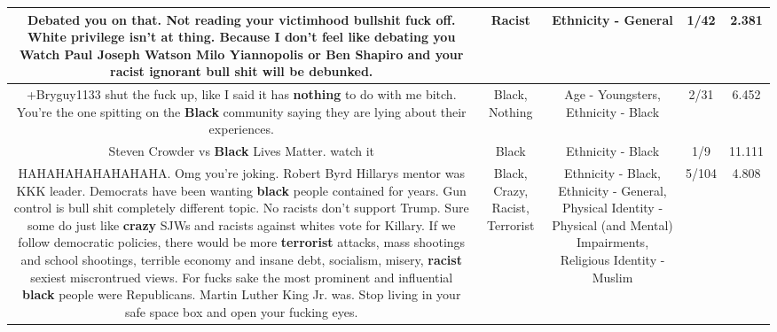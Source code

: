 \documentclass[11pt]{article}
\newlength\mylength
\begin{document}
\begin{center}
\begin{longtable}{|C{.65\mylength}|C{.30\mylength}|C{.12\mylength}|C{.12\mylength}|C{.12\mylength}|}
  \small {} Debated you on that. Not reading  your victimhood bullshit fuck off. White privilege isn't at thing. Because I don't feel like debating you Watch Paul Joseph Watson Milo Yiannopolis or Ben Shapiro and your \textbf{racist} ignorant bull shit will be debunked.\normalsize   & Racist & Ethnicity - General & 1/42 & 2.381 \\  \hline
  \small +Bryguy1133 shut the fuck up, like I said it has \textbf{nothing} to do with me bitch. You're the one spitting on the \textbf{Black} community saying they are lying about their experiences.\normalsize   & Black, Nothing & Age - Youngsters, Ethnicity - Black & 2/31 & 6.452 \\  \hline
  \small {} Steven Crowder vs \textbf{Black} Lives Matter. watch it\normalsize   & Black & Ethnicity - Black & 1/9 & 11.111 \\  \hline
  \small {} HAHAHAHAHAHAHAHA. Omg you're joking. Robert Byrd Hillarys mentor was  KKK leader. Democrats have been wanting \textbf{black} people contained for years. Gun control is bull shit completely different topic. No racists don't support Trump. Sure some do just like \textbf{crazy} SJWs and racists against whites vote for Killary. If we follow democratic policies, there would be more \textbf{terrorist} attacks, mass shootings and school shootings, terrible economy and insane debt, socialism, misery, \textbf{racist} sexiest miscrontrued views. For fucks sake the most prominent and influential \textbf{black} people were Republicans. Martin Luther King Jr. was. Stop living in your safe space box and open your fucking eyes.\normalsize   & Black, Crazy, Racist, Terrorist & Ethnicity - Black, Ethnicity - General, Physical Identity - Physical (and Mental) Impairments, Religious Identity - Muslim & 5/104 & 4.808 \\  \hline

\end{longtable}
\end{center}
\end{document}
